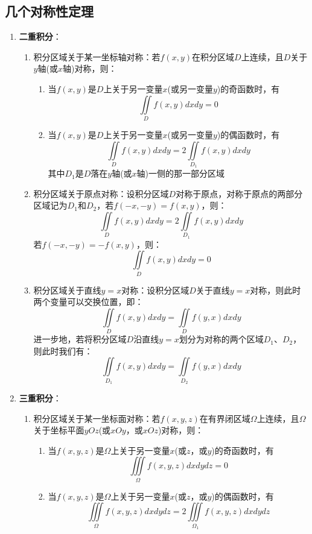 \documentclass[12pt,a4paper,UTF8]{book}
\begin{document}
\subsection{几个对称性定理}
\begin{enumerate}
\item \textbf{二重积分}：
\begin{enumerate}
\item 积分区域关于某一坐标轴对称：若$f\left(x,y\right)$在积分区域$D$上连续，且$D$关于$y$轴(或$x$轴)对称，则：
\begin{enumerate}
\item 当$f\left(x,y\right)$是$D$上关于另一变量$x$(或另一变量$y$)的奇函数时，有
\[\iint\limits_{D}f\left(x,y\right)dxdy=0\]
\item 当$f\left(x,y\right)$是$D$上关于另一变量$x$(或另一变量$y$)的偶函数时，有
\[\iint\limits_{D}f\left(x,y\right)dxdy=2\iint\limits_{D_1}f\left(x,y\right)dxdy\]
其中$D_1$是$D$落在$y$轴(或$x$轴)一侧的那一部分区域
\end{enumerate}
\item 积分区域关于原点对称：设积分区域$D$对称于原点，对称于原点的两部分区域记为$D_1$和$D_2$，若$f\left(-x,-y\right)=f\left(x,y\right)$，则：
\[\iint\limits_{D}f\left(x,y\right)dxdy=2\iint\limits_{D_1}f\left(x,y\right)dxdy\]
若$f\left(-x,-y\right)=-f\left(x,y\right)$，则：
\[\iint\limits_{D}f\left(x,y\right)dxdy=0\]
\item 积分区域关于直线$y=x$对称：设积分区域$D$关于直线$y=x$对称，则此时两个变量可以交换位置，即：
\[\iint\limits_{D}f\left(x,y\right)dxdy=\iint\limits_{D}f\left(y,x\right)dxdy\]
进一步地，若将积分区域$D$沿直线$y=x$划分为对称的两个区域$D_1$、$D_2$，则此时我们有：
\[\iint\limits_{D_1}f\left(x,y\right)dxdy=\iint\limits_{D_2}f\left(y,x\right)dxdy\]
\end{enumerate}
\item \textbf{三重积分}：
\begin{enumerate}
\item 积分区域关于某一坐标面对称：若$f\left(x,y,z\right)$在有界闭区域$\Omega$上连续，且$\Omega$关于坐标平面$yOz$(或$xOy$，或$xOz$)对称，则：
\begin{enumerate}
\item 当$f\left(x,y,z\right)$是$\Omega$上关于另一变量$x$(或$z$，或$y$)的奇函数时，有
\[\iiint\limits_{\Omega}f\left(x,y,z\right)dxdydz=0\]
\item 当$f\left(x,y,z\right)$是$\Omega$上关于另一变量$x$(或$z$，或$y$)的偶函数时，有
\[\iiint\limits_{\Omega}f\left(x,y,z\right)dxdydz=2\iiint\limits_{\Omega_1}f\left(x,y,z\right)dxdydz\]

\end{enumerate}
\end{enumerate}
\end{enumerate}
\end{document}
